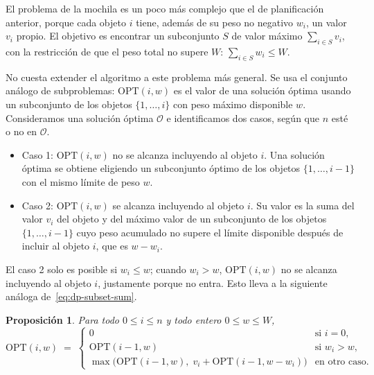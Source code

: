\documentclass[12pt, spanish, oneside, openany]{book}
\theoremstyle{uprightplain}
\newtheorem{proposicion}[teorema]{Proposición}
\theoremstyle{definition}
\theoremstyle{remark}
\theoremstyle{definition}
\newcommand{\OPT}{\mathrm{OPT}} %
\begin{document}
El problema de la mochila es un poco más complejo que el de planificación anterior, porque cada objeto $i$ tiene, además de su peso no negativo $w_i$, un valor $v_i$ propio. El objetivo es encontrar un subconjunto $S$ de valor máximo $\sum_{i\in S}v_i$, con la restricción de que el peso total no supere $W$: $\sum_{i\in S}w_i\le W$.

No cuesta extender el algoritmo a este problema más general. Se usa el conjunto análogo de subproblemas: $\OPT(i,w)$ es el valor de una solución óptima usando un subconjunto de los objetos $\{1,\dots,i\}$ con peso máximo disponible $w$. Consideramos una solución óptima $\mathcal{O}$ e identificamos dos casos, según que $n$ esté o no en $\mathcal{O}$.
\begin{itemize}
    \item Caso 1: $\OPT(i,w)$ no se alcanza incluyendo al objeto $i$. Una solución óptima se obtiene eligiendo un subconjunto óptimo de los objetos $\{1,\dots,i-1\}$ con el mismo límite de peso $w$.
    \item Caso 2: $\OPT(i,w)$ se alcanza incluyendo al objeto $i$. Su valor es la suma del valor $v_i$ del objeto y del máximo valor de un subconjunto de los objetos $\{1,\dots,i-1\}$ cuyo peso acumulado no supere el límite disponible después de incluir al objeto $i$, que es $w-w_i$.
\end{itemize}
El caso 2 solo es posible si $w_i\le w$; cuando $w_i>w$, $\OPT(i,w)$ no se alcanza incluyendo al objeto $i$, justamente porque no entra. Esto lleva a la siguiente análoga de~\eqref{eq:dp-subset-sum}.

\begin{proposicion}
\label{prop:dp-mochila}
Para todo $0\le i\le n$ y todo entero $0\le w\le W$,
\begin{equation}
\label{eq:dp-mochila}
\OPT(i,w) \;=\;
\begin{cases}
0 & \text{si } i=0,\\[2pt]
\OPT(i-1,w) & \text{si } w_i>w,\\[2pt]
\max\bigl(\OPT(i-1,w),\; v_i+\OPT(i-1,w-w_i)\bigr) & \text{en otro caso.}
\end{cases}
\end{equation}
\end{proposicion}
\end{document}
